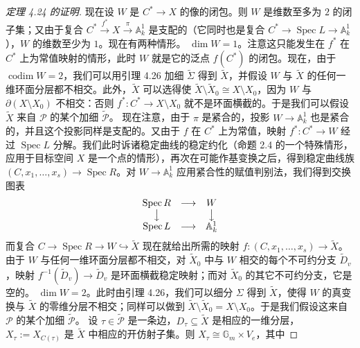 \begin{proof}[定理 4.24 的证明]
现在设 $W$ 是 $C^*\to X$ 的像的闭包。则 $W$ 是维数至多为 $2$ 的闭子集；又由于复合 $C^*\xrightarrow{f^*}X\xrightarrow{\pi}\mathbb{A}^1_k$ 是支配的（它同时也是复合 $C^*\to\operatorname{Spec}L\to\mathbb{A}^1_k$），$W$ 的维数至少为 $1$。现在有两种情形。
 $\dim W=1$。注意这只能发生在 $f^*$ 在 $C^*$ 上为常值映射的情形，此时 $W$ 就是它的泛点 $f(C^*)$ 的闭包。现在，由于 $\operatorname{codim}W=2$，我们可以用引理 4.26 加细 $\widetilde\Sigma$ 得到 $\widetilde X$，并假设 $W$ 与 $\widetilde X$ 的任何一维环面分层都不相交。此外，$\widetilde X$ 可以选得使 $\widetilde X\setminus\widetilde X_0\cong X\setminus X_0$，因为 $W$ 与 $\partial(X\setminus X_0)$ 不相交：否则 $f^*:C^*\to X\setminus X_0$ 就不是环面横截的。于是我们可以假设 $\widetilde X$ 来自 $\mathcal P$ 的某个加细 $\widetilde{\mathcal P}$。
现在注意，由于 $\pi$ 是紧合的，投影 $W\to\mathbb{A}^1_k$ 也是紧合的，并且这个投影同样是支配的。又由于 $f$ 在 $C^*$ 上为常值，映射 $f^*:C^*\to W$ 经过 $\operatorname{Spec}L$ 分解。我们此时诉诸稳定曲线的稳定约化（命题 2.4 的一个特殊情形，应用于目标空间 $X$ 是一个点的情形），再次在可能作基变换之后，得到稳定曲线族 $(C,x_1,\dots,x_s)\to\operatorname{Spec}R$。对 $W\to\mathbb{A}^1_k$ 应用紧合性的赋值判别法，我们得到交换图表
\[
\begin{array}{ccc}
\operatorname{Spec}R & \longrightarrow & W\\
\big\downarrow & & \big\downarrow\\
\operatorname{Spec}L & \longrightarrow & \mathbb{A}^1_k
\end{array}
\]
而复合 $C\to\operatorname{Spec}R\to W\hookrightarrow\widetilde X$ 现在就给出所需的映射 $f:(C,x_1,\dots,x_s)\to\widetilde X$。由于 $W$ 与任何一维环面分层都不相交，对 $\widetilde X_0$ 中与 $W$ 相交的每个不可约分支 $\widetilde D_v$，映射 $f^{-1}(\widetilde D_v)\to\widetilde D_v$ 是环面横截稳定映射；而对 $\widetilde X_0$ 的其它不可约分支，它是空的。
 $\dim W=2$。此时由引理 4.26，我们可以细分 $\Sigma$ 得到 $\widetilde X$，使得 $W$ 的真变换与 $\widetilde X$ 的零维分层不相交；同样可以做到 $\widetilde X\setminus\widetilde X_0=X\setminus X_0$。于是我们假设这来自 $\mathcal P$ 的某个加细 $\widetilde{\mathcal P}$。
设 $\tau\in\widetilde{\mathcal P}$ 是一条边，$D_\tau\subseteq\widetilde X$ 是相应的一维分层，$X_\tau:=X_{C(\tau)}$ 是 $\widetilde X$ 中相应的开仿射子集。则 $X_\tau\cong\mathbb{G}_m\times V_e$，其中

\end{proof}
